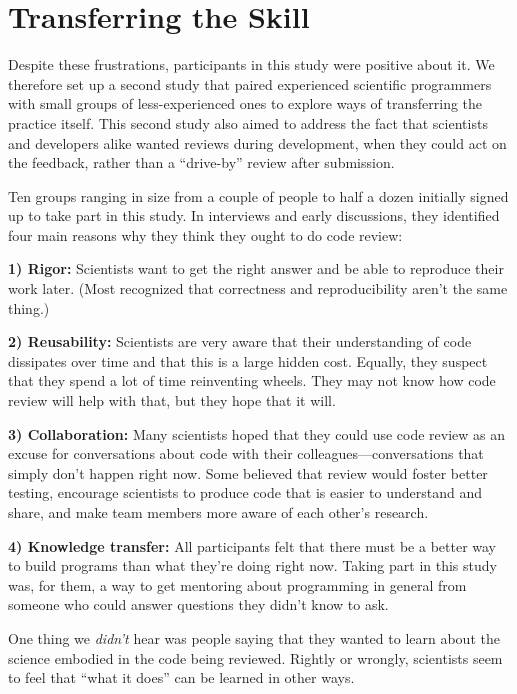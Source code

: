 \documentclass[10pt,twocolumn]{article}
\begin{document}
\section{Transferring the Skill}

Despite these frustrations,
participants in this study were positive about it.
We therefore set up a second study
that paired experienced scientific programmers with small groups of less-experienced ones
to explore ways of transferring the practice itself.
This second study also aimed to address the fact that
scientists and developers alike wanted reviews during development,
when they could act on the feedback,
rather than a ``drive-by'' review after submission.

Ten groups ranging in size from a couple of people to half a dozen initially signed up to take part in this study.
In interviews and early discussions,
they identified four main reasons why they think they ought to do code review:

\noindent \textbf{1) Rigor:}
Scientists want to get the right answer and be able to reproduce their work later.
(Most recognized that correctness and reproducibility aren't the same thing.)

\noindent \textbf{2) Reusability:}
Scientists are very aware that their understanding of code dissipates over time
and that this is a large hidden cost.
Equally, they suspect that they spend a lot of time reinventing wheels.
They may not know how code review will help with that, but they hope that it will.

\noindent \textbf{3) Collaboration:}
Many scientists hoped that they could use code review
as an excuse for conversations about code with their colleagues---conversations
that simply don't happen right now.
Some believed that review would foster better testing,
encourage scientists to produce code that is easier to understand and share,
and make team members more aware of each other's research.

\noindent \textbf{4) Knowledge transfer:}
All participants felt that there must be a better way to build programs than what they're doing right now.
Taking part in this study was,
for them,
a way to get mentoring about programming in general from someone who could answer questions they didn't know to ask.

One thing we \emph{didn't} hear was people saying that
they wanted to learn about the science embodied in the code being reviewed.
Rightly or wrongly,
scientists seem to feel that ``what it does'' can be learned in other ways.
\end{document}
